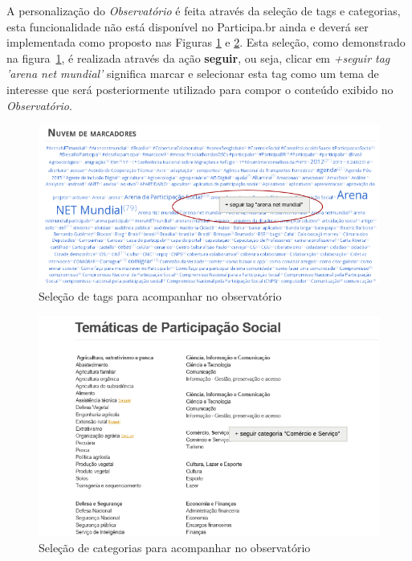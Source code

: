 \documentclass[12pt]{article}
\begin{document}
A personalização do {\it Observatório} é feita através da seleção de tags e
categorias, esta funcionalidade não está disponível no Participa.br ainda e
deverá ser implementada como proposto nas Figuras \ref{observatorio-tags} e
\ref{observatorio-categorias}. Esta seleção, como demonstrado na
figura~\ref{observatorio-tags}, é realizada através da ação {\bf seguir}, ou
seja, clicar em {\it +seguir tag 'arena net mundial'} significa marcar e
selecionar esta tag como um tema de interesse que será posteriormente
utilizado para compor o conteúdo exibido no {\it Observatório}.

\begin{figure}[h!]
\center
\includegraphics[scale=0.5]{observatorio-seguir-tags.png}
\caption{Seleção de tags para acompanhar no observatório}
\label{observatorio-tags}
\end{figure}

\begin{figure}[h!]
\center
\includegraphics[scale=0.5]{observatorio-categoria.png}
\caption{Seleção de categorias para acompanhar no observatório}
\label{observatorio-categorias}
\end{figure}
\end{document}
